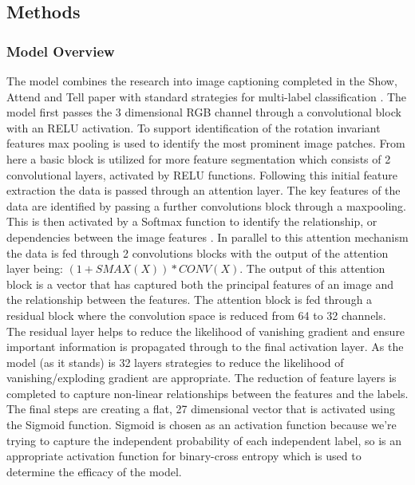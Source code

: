 \documentclass{article}
\begin{document}
\subsection{Methods}
\subsubsection{Model Overview}
The model combines the research into image captioning completed in the Show, Attend and Tell paper with standard strategies for multi-label classification \cite{xu2016show}. The model first passes the 3 dimensional RGB channel through a convolutional block with an RELU activation. To support identification of the rotation invariant features max pooling is used to identify the most prominent image patches. From here a basic block is utilized for more feature segmentation which consists of 2 convolutional layers, activated by RELU functions. 
\newline
\newline
Following this initial feature extraction the data is passed through an attention layer. The key features of the data are identified by passing a further convolutions block through a maxpooling. This is then activated by a Softmax function to identify the relationship, or dependencies between the image features \cite{wang2017residual}. In parallel to this attention mechanism the data is fed through 2 convolutions blocks with the output of the attention layer being: $(1 + SMAX(X))*CONV(X)$. The output of this attention block is a vector that has captured both the principal features of an image and the relationship between the features. 
\newline
\newline
The attention block is fed through a residual block where the convolution space is reduced from 64 to 32 channels. The residual layer helps to reduce the likelihood of vanishing gradient and ensure important information is propagated through to the final activation layer. As the model (as it stands) is 32 layers strategies to reduce the likelihood of vanishing/exploding gradient are appropriate. The reduction of feature layers is completed to capture non-linear relationships between the features and the labels. The final steps are creating a flat, 27 dimensional vector that is activated using the Sigmoid function. Sigmoid is chosen as an activation function because we're trying to capture the independent probability of each independent label, so is an appropriate activation function for binary-cross entropy which is used to determine the efficacy of the model.
\end{document}
